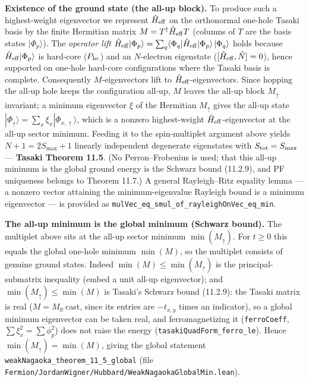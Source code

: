 \documentclass[a4paper,11pt]{article}
\begin{document}
\medskip
\noindent\textbf{Existence of the ground state (the all-up block).}
To produce such a highest-weight eigenvector we represent \(\hat H_{\rm eff}\) on
the orthonormal one-hole Tasaki basis by the finite Hermitian matrix
\(M = T^\dagger \hat H_{\rm eff} T\) (columns of \(T\) are the basis states
\(|\Phi_p\rangle\)). The \emph{operator lift}
\(\hat H_{\rm eff}|\Phi_p\rangle = \sum_q \langle\Phi_q|\hat H_{\rm eff}|\Phi_p\rangle\,
|\Phi_q\rangle\) holds because \(\hat H_{\rm eff}|\Phi_p\rangle\) is hard-core
(\(P_{\rm hc}\)) and an \(N\)-electron eigenstate (\([\hat H_{\rm eff},\hat N]=0\)),
hence supported on one-hole hard-core configurations where the Tasaki basis is
complete. Consequently \(M\)-eigenvectors lift to \(\hat H_{\rm eff}\)-eigenvectors.
Since hopping the all-up hole keeps the configuration all-up, \(M\) leaves the
all-up block \(M_\uparrow\) invariant; a minimum eigenvector \(\xi\) of the
Hermitian \(M_\uparrow\) gives the all-up state
\(|\Phi_\uparrow\rangle = \sum_x \xi_x |\Phi_{x,\uparrow}\rangle\), which is a
nonzero highest-weight \(\hat H_{\rm eff}\)-eigenvector at the all-up sector
minimum. Feeding it to the spin-multiplet argument above yields
\(N+1 = 2S_{\max}+1\) linearly independent degenerate eigenstates with
\(S_{\rm tot} = S_{\max}\) — \textbf{Tasaki Theorem 11.5}. (No Perron--Frobenius is
used; that this all-up minimum is the global ground energy is the Schwarz bound
(11.2.9), and PF uniqueness belongs to Theorem 11.7.) A general Rayleigh--Ritz
equality lemma — a nonzero vector attaining the minimum-eigenvalue Rayleigh bound
is a minimum eigenvector — is provided as
\texttt{mulVec\_eq\_smul\_of\_rayleighOnVec\_eq\_min}.

\medskip
\noindent\textbf{The all-up minimum is the global minimum (Schwarz bound).}
The multiplet above sits at the all-up sector minimum \(\min(M_\uparrow)\). For
\(t \ge 0\) this equals the global one-hole minimum \(\min(M)\), so the multiplet
consists of genuine ground states. Indeed \(\min(M) \le \min(M_\uparrow)\) is the
principal-submatrix inequality (embed a unit all-up eigenvector); and
\(\min(M_\uparrow) \le \min(M)\) is Tasaki's Schwarz bound (11.2.9): the Tasaki
matrix is real (\(M = M_{\mathbb R}\,\)cast, since its entries are
\(-t_{x,y}\) times an indicator), so a global minimum eigenvector can be taken
real, and ferromagnetizing it (\texttt{ferroCoeff}, \(\sum\xi_x^2 = \sum\phi_p^2\))
does not raise the energy (\texttt{tasakiQuadForm\_ferro\_le}). Hence
\(\min(M_\uparrow) = \min(M)\), giving the global statement
\texttt{weakNagaoka\_theorem\_11\_5\_global}
(file \texttt{Fermion/JordanWigner/Hubbard/WeakNagaokaGlobalMin.lean}).
\end{document}
